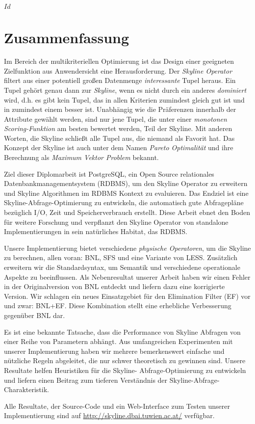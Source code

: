 
\svnInfo $Id$


\chapter*{Zusammenfassung\revision}


Im Bereich der multikriteriellen Optimierung ist das Design einer
geeigneten Zielfunktion aus Anwendersicht eine Herausforderung.
%
Der \emph{Skyline Operator} filtert aus einer potentiell gro\ss{}en
Datenmenge \emph{interessante} Tupel heraus.
%
Ein Tupel geh\"ort genau dann zur \emph{Skyline}, wenn es nicht durch
ein anderes \emph{dominiert} wird, d.h. es gibt kein Tupel, das in allen
Kriterien zumindest gleich gut ist und in zumindest einem besser ist.
%
Unabh\"angig wie die Pr\"aferenzen innerhalb der Attribute gew\"ahlt
werden, sind nur jene Tupel, die unter einer \emph{monotonen
Scoring-Funktion} am besten bewertet werden, Teil der Skyline.
%
Mit anderen Worten, die Skyline schlie\ss{}t alle Tupel aus, die
niemand als Favorit hat.
%
Das Konzept der Skyline ist auch unter dem Namen \emph{Pareto
Optimalit\"at} und ihre Berechnung als \emph{Maximum Vektor
Problem} bekannt.


Ziel dieser Diplomarbeit ist PostgreSQL, ein Open Source relationales
Datenbankmanagementsystem (RDBMS), um den Skyline Operator zu
erweitern und Skyline Algorithmen im RDBMS Kontext zu evaluieren.
%
Das Endziel ist eine Skyline-Abfrage-Optimierung zu entwickeln, 
die automatisch gute Abfragepl\"ane bez\"uglich I/O, Zeit und
Speicherverbrauch erstellt.
%
Diese Arbeit ebnet den Boden f\"ur weitere Forschung und verpflanzt
den Skyline Operator von standalone Implementierungen in sein
nat\"urliches Habitat, das RDBMS.


Unsere Implementierung bietet verschiedene \emph{physische
Operatoren}, um die Skyline zu berechnen, allen voran: BNL, SFS und
eine Variante von LESS.
%
Zus\"atzlich erweitern wir die Standardsyntax, um Semantik und
verschiedene operationale Aspekte zu beeinflussen.
%
Als Nebenresultat unserer Arbeit haben wir einen Fehler in der
Originalversion von BNL entdeckt und liefern dazu eine korrigierte
Version.
%
Wir schlagen ein neues Einsatzgebiet f\"ur den Elimination Filter (EF)
vor und zwar: BNL+EF. Diese Kombination stellt eine erhebliche
Verbesserung gegen\"uber BNL dar.

Es ist eine bekannte Tatsache, dass die Performance von Skyline
Abfragen von einer Reihe von Parametern abh\"angt.
%
Aus umfangreichen Experimenten mit unserer Implementierung haben wir
mehrere bemerkenswert einfache und n\"utzliche Regeln abgeleitet, die
nur schwer theoretisch zu gewinnen sind.
%
Unsere Resultate helfen Heuristiken f\"ur die Skyline-%
Abfrage-Optimierung zu entwickeln und liefern einen Beitrag zum
tieferen Verst\"andnis der Skyline-Abfrage-Charakteristik.


Alle Resultate, der Source-Code und ein Web-Interface zum Testen
unserer Implementierung sind auf
\url{http://skyline.dbai.tuwien.ac.at/} verf\"ugbar.
